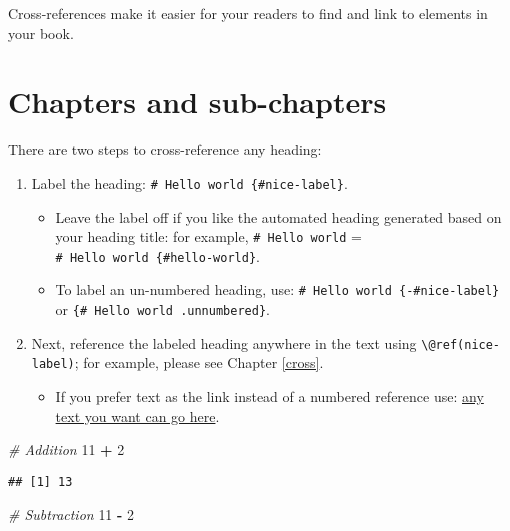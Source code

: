 \documentclass[
]{book}
\newenvironment{Shaded}{\begin{snugshade}}{\end{snugshade}}
\newcommand{\CommentTok}[1]{\textcolor[rgb]{0.56,0.35,0.01}{\textit{#1}}}
\newcommand{\DecValTok}[1]{\textcolor[rgb]{0.00,0.00,0.81}{#1}}
\newcommand{\SpecialCharTok}[1]{\textcolor[rgb]{0.81,0.36,0.00}{\textbf{#1}}}
\providecommand{\tightlist}{%
  \setlength{\itemsep}{0pt}\setlength{\parskip}{0pt}}
\theoremstyle{definition}
\theoremstyle{definition}
\theoremstyle{definition}
\theoremstyle{definition}
\theoremstyle{remark}
\begin{document}
Cross-references make it easier for your readers to find and link to elements in your book.

\hypertarget{chapters-and-sub-chapters}{%
\section{Chapters and sub-chapters}\label{chapters-and-sub-chapters}}

There are two steps to cross-reference any heading:

\begin{enumerate}
\def\labelenumi{\arabic{enumi}.}
\tightlist
\item
  Label the heading: \texttt{\#\ Hello\ world\ \{\#nice-label\}}.

  \begin{itemize}
  \tightlist
  \item
    Leave the label off if you like the automated heading generated based on your heading title: for example, \texttt{\#\ Hello\ world} = \texttt{\#\ Hello\ world\ \{\#hello-world\}}.
  \item
    To label an un-numbered heading, use: \texttt{\#\ Hello\ world\ \{-\#nice-label\}} or \texttt{\{\#\ Hello\ world\ .unnumbered\}}.
  \end{itemize}
\item
  Next, reference the labeled heading anywhere in the text using \texttt{\textbackslash{}@ref(nice-label)}; for example, please see Chapter \ref{cross}.

  \begin{itemize}
  \tightlist
  \item
    If you prefer text as the link instead of a numbered reference use: \protect\hyperlink{cross}{any text you want can go here}.
  \end{itemize}
\end{enumerate}

\begin{Shaded}
\begin{Highlighting}[]
\CommentTok{\# Addition}
\DecValTok{11} \SpecialCharTok{+} \DecValTok{2}
\end{Highlighting}
\end{Shaded}

\begin{verbatim}
## [1] 13
\end{verbatim}

\begin{Shaded}
\begin{Highlighting}[]
\CommentTok{\# Subtraction}
\DecValTok{11} \SpecialCharTok{{-}} \DecValTok{2}  
\end{Highlighting}
\end{Shaded}
\end{document}
